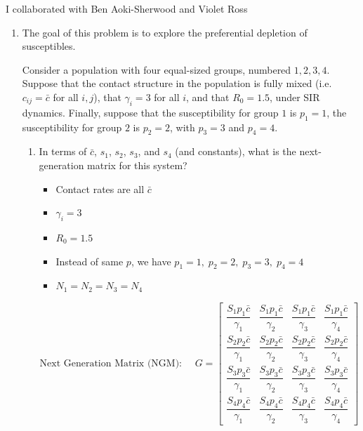 \documentclass[11pt]{article}
\begin{document}
I collaborated with Ben Aoki-Sherwood and Violet Ross

\begin{enumerate}

\item The goal of this problem is to explore the preferential depletion of susceptibles. 

Consider a population with four equal-sized groups, numbered $1, 2, 3, 4$. Suppose that the contact structure in the population is fully mixed (i.e. $c_{ij} = \bar{c}$ for all $i,j$), that $\gamma_i = 3$ for all $i$, and that $R_0=1.5$, under SIR dynamics. Finally, suppose that the susceptibility for group $1$ is $p_1=1$, the susceptibility for group $2$ is $p_2=2$, with $p_3 = 3$ and $p_4=4$. 

\begin{enumerate}[label=\alph*.]
	\item In terms of $\bar{c}$, $s_1$, $s_2$, $s_3$, and $s_4$ (and constants), what is the next-generation matrix for this system?
	\par
	\begin{itemize}
		\item Contact rates are all $\bar{c}$
		\item $\gamma_i = 3$
		\item $R_0 = 1.5$
		\item Instead of same $p$, we have $p_1 = 1, \; p_2 = 2, \; p_3 = 3, \; p_4 = 4$
		\item $N_1 = N_2 = N_3 = N_4$
	\end{itemize}

	\[
	\text{Next Generation Matrix (NGM): } 
	\quad
	G = 
	\begin{bmatrix}
	\dfrac{S_1 p_1 \bar{c}}{\gamma_1} & \dfrac{S_1 p_1 \bar{c}}{\gamma_2} & \dfrac{S_1 p_1 \bar{c}}{\gamma_3} & \dfrac{S_1 p_1 \bar{c}}{\gamma_4} \\[1em]
	\dfrac{S_2 p_2 \bar{c}}{\gamma_1} & \dfrac{S_2 p_2 \bar{c}}{\gamma_2} & \dfrac{S_2 p_2 \bar{c}}{\gamma_3} & \dfrac{S_2 p_2 \bar{c}}{\gamma_4} \\[1em]
	\dfrac{S_3 p_3 \bar{c}}{\gamma_1} & \dfrac{S_3 p_3 \bar{c}}{\gamma_2} & \dfrac{S_3 p_3 \bar{c}}{\gamma_3} & \dfrac{S_3 p_3 \bar{c}}{\gamma_4} \\[1em]
	\dfrac{S_4 p_4 \bar{c}}{\gamma_1} & \dfrac{S_4 p_4 \bar{c}}{\gamma_2} & \dfrac{S_4 p_4 \bar{c}}{\gamma_3} & \dfrac{S_4 p_4 \bar{c}}{\gamma_4}
	\end{bmatrix}
	\]


\end{enumerate}
\end{enumerate}
\end{document}

